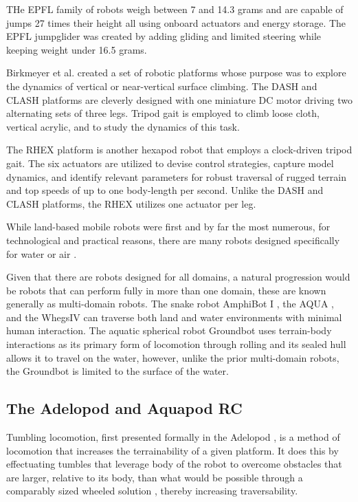 		THe EPFL family of robots \cite{MirkoKovac2010} weigh between 7 and 14.3 grams and are capable of jumps 27 times their height all using onboard actuators and energy storage. The EPFL jumpglider was created by adding gliding and limited steering while keeping weight under 16.5 grams.

		Birkmeyer et al. \cite{Birkmeyer2013} created a set of robotic platforms whose purpose was to explore the dynamics of vertical or near-vertical surface climbing. The DASH and CLASH platforms are cleverly designed with one miniature DC motor driving two alternating sets of three legs. Tripod gait is employed to climb loose cloth, vertical acrylic, and to study the dynamics of this task. 

		The RHEX platform \cite{Saranli2001a} is another hexapod robot that employs a clock-driven tripod gait. The six actuators are utilized to devise control strategies, capture model dynamics, and identify relevant parameters for robust traversal of rugged terrain and top speeds of up to one body-length per second. Unlike the DASH and CLASH platforms, the RHEX utilizes one actuator per leg. 

		While land-based mobile robots were first and by far the most numerous, for technological and practical reasons, there are many robots designed specifically for water \cite{Villanueva2013} \cite{Yu2018} or air \cite{Neumann2012} \cite{Morton2013}.  
		
		Given that there are robots designed for all domains, a natural progression would be robots that can perform fully in more than one domain, these are known generally as multi-domain robots. The snake robot AmphiBot I \cite{Crespi2005a}, the AQUA \cite{Dudek2007}, and the Whegs\texttrademark IV \cite{Boxerbaum2005} can traverse both land and water environments with minimal human interaction. The aquatic spherical robot Groundbot \cite{Kaznov2010} uses terrain-body interactions as its primary form of locomotion through rolling and its sealed hull allows it to travel on the water, however, unlike the prior multi-domain robots, the Groundbot is limited to the surface of the water.

	
	\subsection{The Adelopod and Aquapod RC}
	\label{sec:adelopod_aquapodrc}


		Tumbling locomotion, first presented formally in the Adelopod \cite{Hemes2009}, is a method of locomotion that increases the terrainability of a given platform. It does this by effectuating tumbles that leverage body of the robot to overcome obstacles that are larger, relative to its body, than what would be possible through a comparably sized wheeled solution \cite{Hemes2011}, thereby increasing traversability. 

